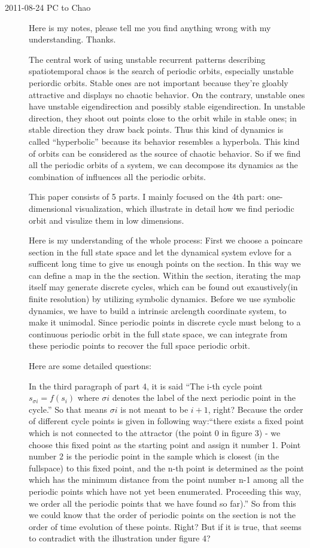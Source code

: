 \begin{description}

\item[2011-08-24 PC to Chao]
Here is my notes, please tell me you find anything wrong with my understanding. Thanks.

The central work of using unstable recurrent patterns describing spatiotemporal chaos is the search of 
periodic orbits, especially unstable periordic orbits. Stable ones are not important because they're gloably attractive and displays no chaotic behavior. On the contrary, unstable ones have unstable eigendirection and possibly stable eigendirection. In unstable direction, they shoot out points close to the orbit while in stable ones; in stable direction they draw back points. Thus this kind of dynamics is called ``hyperbolic'' because its behavior resembles a hyperbola. This kind of orbits can be considered as the source of chaotic behavior. So if we find all the periodic orbits of a system, we can decompose its dynamics as the combination of influences all the periodic orbits.

This paper consists of 5 parts. I mainly focused on the 4th part: one-dimensional visualization, which illustrate in detail how we find periodic orbit and visulize them in low dimensions.
 
Here is my understanding of the whole process: First we choose a poincare section in the full state space and let the dynamical system evlove for a sufficent long time to give us enough points on the section. In this way we can define a map in the the section. Within the section, iterating the map itself may generate discrete cycles, which can be found out exaustively(in finite resolution) by utilizing symbolic dynamics. Before we use symbolic dynamics, we have to build a intrinsic arclength coordinate system, to make it unimodal. Since periodic points in discrete cycle must belong to a continuous periodic orbit in the full state space, we can integrate from these periodic points to recover the full space periodic orbit. 

Here are some detailed questions:

In the third paragraph of part 4, it is said ``The i-th cycle point $s_{\sigma i} = f(s_i)$ where $\sigma i$ denotes  the label of the next periodic point in the cycle.'' So that means $\sigma i$ is not meant to be $i+1$, right? Because the order of different cycle points is given in following way:``there exists a fixed point which is not connected to the attractor (the point 0 in figure 3) - we choose this fixed point as the starting point and assign it number 1. Point number 2 is the periodic point in the sample which is closest (in the fullspace) to this fixed point, and the n-th point is determined as the point which has the minimum distance from the point number n-1 among all the periodic points which have not yet been enumerated. Proceeding this way, we order all the periodic points that we have found so far).''  So from this we could know that the order of periodic points on the section is not the order of time evolution of these points. Right? But if it is true, that seems to contradict with the illustration under figure 4? 


\end{description}
